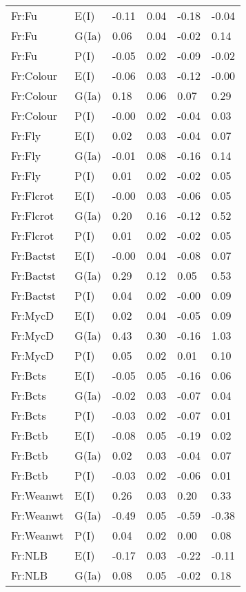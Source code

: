 \begin{center}
\begin{longtable}{|p{1.1in}|p{0.7in}|p{0.7in}|p{0.6in}|p{0.6in}|p{0.6in}|}
  Fr:Fu & E(I) & -0.11 & 0.04 & -0.18 & -0.04 \\ 
  Fr:Fu & G(Ia) & 0.06 & 0.04 & -0.02 & 0.14 \\ 
  Fr:Fu & P(I) & -0.05 & 0.02 & -0.09 & -0.02 \\ 
  Fr:Colour & E(I) & -0.06 & 0.03 & -0.12 & -0.00 \\ 
  Fr:Colour & G(Ia) & 0.18 & 0.06 & 0.07 & 0.29 \\ 
  Fr:Colour & P(I) & -0.00 & 0.02 & -0.04 & 0.03 \\ 
  Fr:Fly & E(I) & 0.02 & 0.03 & -0.04 & 0.07 \\ 
  Fr:Fly & G(Ia) & -0.01 & 0.08 & -0.16 & 0.14 \\ 
  Fr:Fly & P(I) & 0.01 & 0.02 & -0.02 & 0.05 \\ 
  Fr:Flcrot & E(I) & -0.00 & 0.03 & -0.06 & 0.05 \\ 
  Fr:Flcrot & G(Ia) & 0.20 & 0.16 & -0.12 & 0.52 \\ 
  Fr:Flcrot & P(I) & 0.01 & 0.02 & -0.02 & 0.05 \\ 
  Fr:Bactst & E(I) & -0.00 & 0.04 & -0.08 & 0.07 \\ 
  Fr:Bactst & G(Ia) & 0.29 & 0.12 & 0.05 & 0.53 \\ 
  Fr:Bactst & P(I) & 0.04 & 0.02 & -0.00 & 0.09 \\ 
  Fr:MycD & E(I) & 0.02 & 0.04 & -0.05 & 0.09 \\ 
  Fr:MycD & G(Ia) & 0.43 & 0.30 & -0.16 & 1.03 \\ 
  Fr:MycD & P(I) & 0.05 & 0.02 & 0.01 & 0.10 \\ 
  Fr:Bcts & E(I) & -0.05 & 0.05 & -0.16 & 0.06 \\ 
  Fr:Bcts & G(Ia) & -0.02 & 0.03 & -0.07 & 0.04 \\ 
  Fr:Bcts & P(I) & -0.03 & 0.02 & -0.07 & 0.01 \\ 
  Fr:Bctb & E(I) & -0.08 & 0.05 & -0.19 & 0.02 \\ 
  Fr:Bctb & G(Ia) & 0.02 & 0.03 & -0.04 & 0.07 \\ 
  Fr:Bctb & P(I) & -0.03 & 0.02 & -0.06 & 0.01 \\ 
  Fr:Weanwt & E(I) & 0.26 & 0.03 & 0.20 & 0.33 \\ 
  Fr:Weanwt & G(Ia) & -0.49 & 0.05 & -0.59 & -0.38 \\ 
  Fr:Weanwt & P(I) & 0.04 & 0.02 & 0.00 & 0.08 \\ 
  Fr:NLB & E(I) & -0.17 & 0.03 & -0.22 & -0.11 \\ 
  Fr:NLB & G(Ia) & 0.08 & 0.05 & -0.02 & 0.18 \\ 

\end{longtable}
\end{center}
